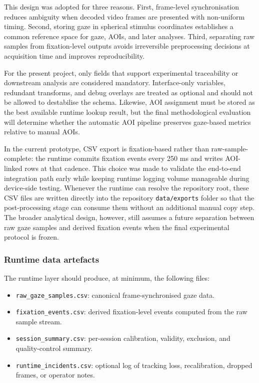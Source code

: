 \documentclass[11pt]{article}
\begin{document}
This design was adopted for three reasons. First, frame-level synchronisation reduces ambiguity when decoded video frames are presented with non-uniform timing. Second, storing gaze in spherical stimulus coordinates establishes a common reference space for gaze, AOIs, and later analyses. Third, separating raw samples from fixation-level outputs avoids irreversible preprocessing decisions at acquisition time and improves reproducibility.

For the present project, only fields that support experimental traceability or downstream analysis are considered mandatory. Interface-only variables, redundant transforms, and debug overlays are treated as optional and should not be allowed to destabilise the schema. Likewise, AOI assignment must be stored as the best available runtime lookup result, but the final methodological evaluation will determine whether the automatic AOI pipeline preserves gaze-based metrics relative to manual AOIs.

In the current prototype, CSV export is fixation-based rather than raw-sample-complete: the runtime commits fixation events every 250 ms and writes AOI-linked rows at that cadence. This choice was made to validate the end-to-end integration path early while keeping runtime logging volume manageable during device-side testing. Whenever the runtime can resolve the repository root, these CSV files are written directly into the repository \texttt{data/exports} folder so that the post-processing stage can consume them without an additional manual copy step. The broader analytical design, however, still assumes a future separation between raw gaze samples and derived fixation events when the final experimental protocol is frozen.

\subsubsection{Runtime data artefacts}

The runtime layer should produce, at minimum, the following files:

\begin{itemize}
    \item \texttt{raw\_gaze\_samples.csv}: canonical frame-synchronised gaze data.
    \item \texttt{fixation\_events.csv}: derived fixation-level events computed from the raw sample stream.
    \item \texttt{session\_summary.csv}: per-session calibration, validity, exclusion, and quality-control summary.
    \item \texttt{runtime\_incidents.csv}: optional log of tracking loss, recalibration, dropped frames, or operator notes.
\end{itemize}
\end{document}
